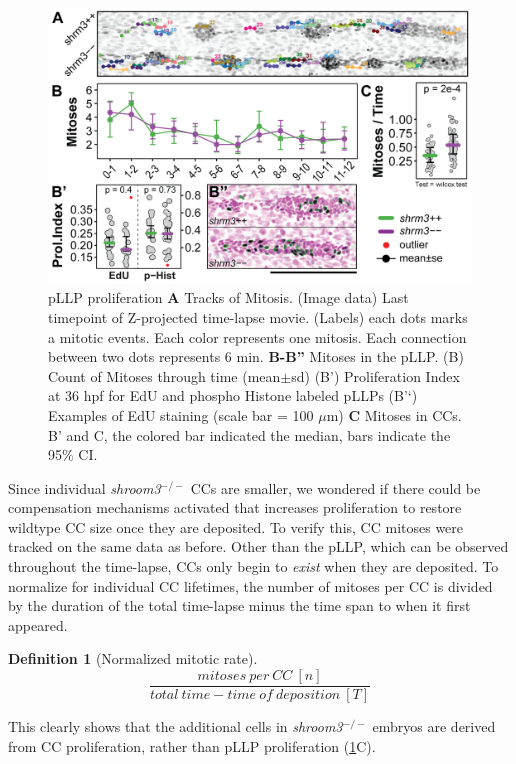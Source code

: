 \documentclass[11pt,singlespacinge,twoside]{reedthesis} %
\theoremstyle{definition}
\newtheorem{definition}{Definition}[chapter]
\theoremstyle{definition}
\theoremstyle{definition}
\theoremstyle{remark}
\begin{document}
\begin{figure}

{\centering \includegraphics[width=0.85\linewidth]{figures/results/02_proliferation/prol-01} 

}

\caption[pLLP proliferation]{pLLP proliferation \textbf{A} Tracks of Mitosis. (Image data) Last timepoint of Z-projected time-lapse movie. (Labels) each dots marks a mitotic events. Each color represents one mitosis. Each connection between two dots represents 6 min. \textbf{B-B''} Mitoses in the pLLP. (B) Count of Mitoses through time (mean\(\pm\)sd) (B') Proliferation Index at 36 hpf for EdU and phospho Histone labeled pLLPs (B'`) Examples of EdU staining (scale bar = 100 \(\mu\)m) \textbf{C} Mitoses in CCs. B' and C, the colored bar indicated the median, bars indicate the 95\% CI.}\label{fig:prolpLLP}
\end{figure}
Since individual \emph{shroom3}\(^{-/-}\) CCs are smaller, we wondered if there could be compensation mechanisms activated that increases proliferation to restore wildtype CC size once they are deposited. To verify this, CC mitoses were tracked on the same data as before. Other than the pLLP, which can be observed throughout the time-lapse, CCs only begin to \emph{exist} when they are deposited. To normalize for individual CC lifetimes, the number of mitoses per CC is divided by the duration of the total time-lapse minus the time span to when it first appeared.
\begin{definition}[Normalized mitotic rate]
\protect\hypertarget{def:unnamed-chunk-10}{}{\label{def:unnamed-chunk-10} {} }\[\frac{mitoses\ per\ CC\ [n]}{total\ time- time\ of\ deposition\ [T]}\]
\end{definition}
This clearly shows that the additional cells in \emph{shroom3}\(^{-/-}\) embryos are derived from CC proliferation, rather than pLLP proliferation (\ref{fig:prolpLLP}C).
\end{document}
